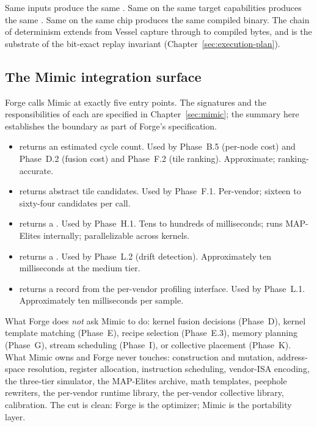 Same inputs produce the same .
Same  on the same target capabilities produces the same .
Same  on the same chip produces the same compiled binary.
The chain of determinism extends from Vessel capture through to compiled bytes, and is the substrate of the bit-exact replay invariant (Chapter~\ref{sec:execution-plan}).

\subsection{The Mimic integration surface}
\label{sec:forge-mimic-surface}

Forge calls Mimic at exactly five entry points.
The signatures and the responsibilities of each are specified in Chapter~\ref{sec:mimic}; the summary here establishes the boundary as part of Forge's specification.

\begin{itemize}
  \item {} returns an estimated cycle count.
        Used by Phase~B.5 (per-node cost) and Phase~D.2 (fusion cost) and Phase~F.2 (tile ranking).
        Approximate; ranking-accurate.
  \item {} returns abstract tile candidates.
        Used by Phase~F.1.
        Per-vendor; sixteen to sixty-four candidates per call.
  \item {} returns a .
        Used by Phase~H.1.
        Tens to hundreds of milliseconds; runs MAP-Elites internally; parallelizable across kernels.
  \item {} returns a .
        Used by Phase~L.2 (drift detection).
        Approximately ten milliseconds at the medium tier.
  \item {} returns a  record from the per-vendor profiling interface.
        Used by Phase~L.1.
        Approximately ten milliseconds per sample.
\end{itemize}

What Forge does \emph{not} ask Mimic to do: kernel fusion decisions (Phase~D), kernel template matching (Phase~E), recipe selection (Phase~E.3), memory planning (Phase~G), stream scheduling (Phase~I), or collective placement (Phase~K).
What Mimic owns and Forge never touches:  construction and mutation, address-space resolution, register allocation, instruction scheduling, vendor-ISA encoding, the three-tier simulator, the MAP-Elites archive, math templates, peephole rewriters, the per-vendor runtime library, the per-vendor collective library, calibration.
The cut is clean: Forge is the optimizer; Mimic is the portability layer.
